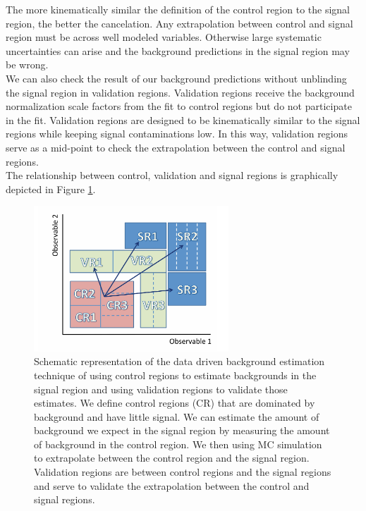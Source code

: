 \indent The more kinematically similar the definition of the control region to the signal region, the better the cancelation.  Any extrapolation between control and signal region must be across well modeled variables.  Otherwise large systematic uncertainties can arise and the background predictions in the signal region may be wrong.  \\

\indent We can also check the result of our background predictions without unblinding the signal region in validation regions.  Validation regions receive the background normalization scale factors from the fit to control regions but do not participate in the fit.   Validation regions are designed to be kinematically similar to the signal regions while keeping signal contaminations low.  In this way, validation regions serve as a mid-point to check the extrapolation between the control and signal regions.  \\

\indent The relationship between control, validation and signal regions is graphically depicted in Figure \ref{fig:CR_VR_SR_stat}. \\

\begin{figure}[h!]
  \centering
	\includegraphics[width=0.65\textwidth]{./figures/statistics/CR_VR_SR.pdf}
\caption[Schematic representation of the relationship between control, validation and signal regions]{Schematic representation of the data driven background estimation technique of using control regions to estimate backgrounds in the signal region and using validation regions to validate those estimates.  We define control regions (CR) that are dominated by background and have little signal.  We can estimate the amount of background we expect in the signal region by measuring the amount of background in the control region.  We then using MC simulation to extrapolate between the control region and the signal region. Validation regions are between control regions and the signal regions and serve to validate the extrapolation between the control and signal regions.  }
\label{fig:CR_VR_SR_stat}
\end{figure}

